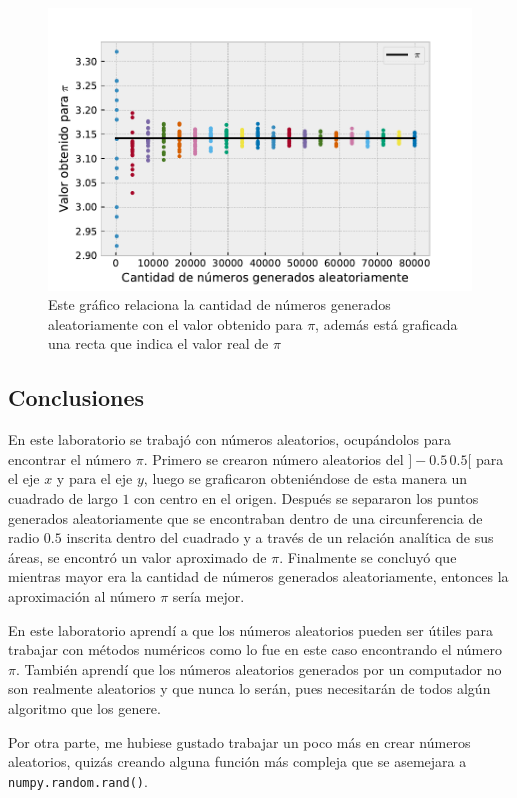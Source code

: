 \documentclass[../portafolio.tex]{subfiles}
\begin{document}
\begin{figure}[H]
    \centering
    \includegraphics[scale=0.8]{tex/img/puntos_pi.pdf}
    \caption{Este gráfico relaciona la cantidad de números generados aleatoriamente con el valor obtenido para $\pi$, además está graficada una recta que indica el valor real de $\pi$}
    \label{puntos_pi}
\end{figure}










\subsection{Conclusiones}
En este laboratorio se trabajó con números aleatorios, ocupándolos para encontrar el número $\pi$. Primero se crearon número aleatorios del $]-0.5\,0.5[$ para el eje $x$ y para el eje $y$, luego se graficaron obteniéndose de esta manera un cuadrado de largo $1$ con centro en el origen. Después se separaron los puntos generados aleatoriamente que se encontraban dentro de una circunferencia de radio $0.5$ inscrita dentro del cuadrado y a través de un relación analítica de sus áreas, se encontró un valor aproximado de $\pi$. Finalmente se concluyó que mientras mayor era la cantidad de números generados aleatoriamente, entonces la aproximación al número $\pi$ sería mejor.

\vspace{2mm}
En este laboratorio aprendí a que los números aleatorios pueden ser útiles para trabajar con métodos numéricos como lo fue en este caso encontrando el número $\pi$. También aprendí que los números aleatorios generados por un computador no son realmente aleatorios y que nunca lo serán, pues necesitarán de todos algún algoritmo que los genere.

\vspace{2mm}
Por otra parte, me hubiese gustado trabajar un poco más en crear números aleatorios, quizás creando alguna función más compleja que se asemejara a \texttt{numpy.random.rand()}.
\end{document}
